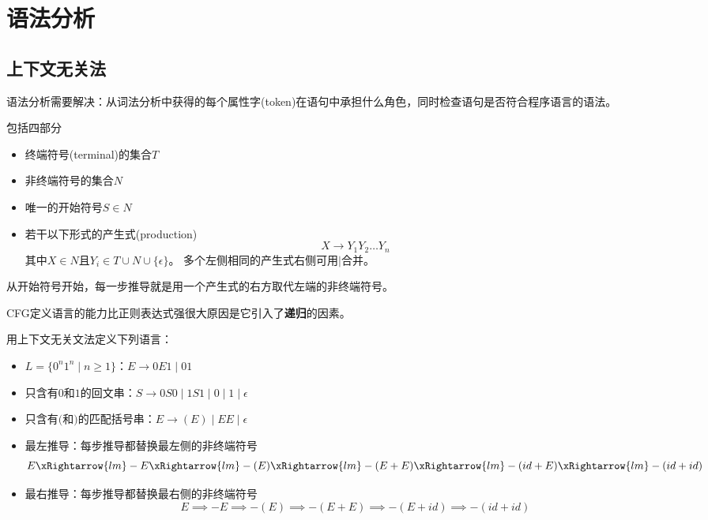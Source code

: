 
\section{语法分析}
\subsection{上下文无关法}
语法分析需要解决：从词法分析中获得的每个属性字(token)在语句中承担什么角色，同时检查语句是否符合程序语言的语法。
\begin{definition}
包括四部分
\begin{itemize}
	\item 终端符号(terminal)的集合$T$
	\item 非终端符号的集合$N$
	\item 唯一的开始符号$S\in N$
	\item 若干以下形式的产生式(production)
	\[X\to Y_1Y_2\ldots Y_n\]
	其中$X\in N$且$Y_i\in T\cup N\cup\{\epsilon\}$。
	多个左侧相同的产生式右侧可用$\mid$合并。
\end{itemize}
\end{definition}
\begin{definition}[推导(derivation)]
从开始符号开始，每一步推导就是用一个产生式的右方取代左端的非终端符号。
\end{definition}

CFG定义语言的能力比正则表达式强很大原因是它引入了\textbf{递归}的因素。

\begin{example}
用上下文无关文法定义下列语言：
\begin{itemize}
	\item $L=\{0^n1^n\mid n\geq 1\}$：$E\to 0E1\mid 01$
	\item 只含有$0$和$1$的回文串：$S\to 0S0\mid 1S1\mid 0\mid 1\mid \epsilon$
	\item 只含有$($和$)$的匹配括号串：$E\to (E)\mid EE\mid \epsilon$
\end{itemize}
\end{example}

\begin{itemize}
	\item 最左推导：每步推导都替换最左侧的非终端符号
	\[E\xRightarrow{lm}
	-E\xRightarrow{lm}
	-(E)\xRightarrow{lm}
	-(E+E)\xRightarrow{lm}
	-(id+E)\xRightarrow{lm}
	-(id+id)\]
	\item 最右推导：每步推导都替换最右侧的非终端符号
	\[E\implies
	-E\implies
	-(E)\implies
	-(E+E)\implies
	-(E+id)\implies
	-(id+id)\]
\end{itemize}

